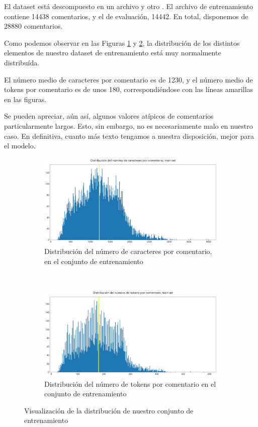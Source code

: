 El dataset está descompuesto en un archivo  y otro . El archivo de entrenamiento contiene 14438 comentarios, y el de evaluación, 14442. En total, disponemos de 28880 comentarios.

Como podemos observar en las Figuras \ref{fig:avg_char_train} y \ref{fig:avg_tokens_train}, la distribución de los distintos elementos de nuestro dataset de entrenamiento está muy normalmente distribuída.

El número medio de caracteres por comentario es de 1230, y el número medio de tokens por comentario es de unos 180, correspondiéndose con las líneas amarillas en las figuras.

Se pueden apreciar, aún así, algunos valores atípicos de comentarios particularmente largos. Esto, sin embargo, no es necesariamente malo en nuestro caso. En definitiva, cuanto más texto tengamos a nuestra disposición, mejor para el modelo.

\begin{figure}[h!]
	\centering
	\begin{subfigure}[t]{0.95\textwidth}
		\centering
		\includegraphics[width=.9\textwidth]{media/char_hist_train.pdf}
		\caption{Distribución del número de caracteres por comentario, en el conjunto de entrenamiento}
		\label{fig:avg_char_train}
	\end{subfigure}
	~

	\begin{subfigure}[t]{0.95\textwidth}
		\centering
		\includegraphics[width=.9\textwidth]{media/tokens_hist_train.pdf}
		\caption{Distribución del número de tokens por comentario en el conjunto de entrenamiento}
		\label{fig:avg_tokens_train}
	\end{subfigure}

	\caption{Visualización de la distribución de nuestro conjunto de entrenamiento}
	\label{fig:sum_train}
\end{figure}



